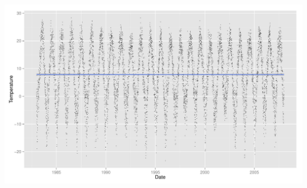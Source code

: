 \documentclass{article}\usepackage{graphicx, color}
\makeatletter
\def\maxwidth{ %
  \ifdim\Gin@nat@width>\linewidth
    \linewidth
  \else
    \Gin@nat@width
  \fi
}
\newenvironment{knitrout}{}{} %
\makeatother
\begin{document}
\begin{landscape}
\begin{knitrout}
\color{fgcolor}
\includegraphics[width=\maxwidth]{figure/graph3Landscape} 

\end{knitrout}

\end{landscape}
\end{document}
